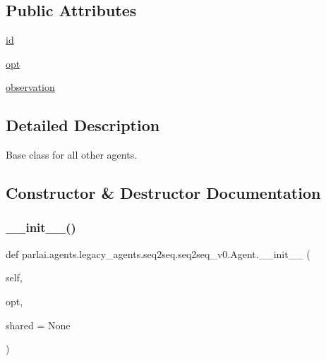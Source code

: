 \subsection*{Public Attributes}
\begin{DoxyCompactItemize}
\item 
\hyperlink{classparlai_1_1agents_1_1legacy__agents_1_1seq2seq_1_1seq2seq__v0_1_1Agent_a446e864fc95a310d508e3095c7f3d930}{id}
\item 
\hyperlink{classparlai_1_1agents_1_1legacy__agents_1_1seq2seq_1_1seq2seq__v0_1_1Agent_ae07383697f7232bb21cbd0a1c6e93389}{opt}
\item 
\hyperlink{classparlai_1_1agents_1_1legacy__agents_1_1seq2seq_1_1seq2seq__v0_1_1Agent_a6371fe160ef331078a794fc1d8b67371}{observation}
\end{DoxyCompactItemize}


\subsection{Detailed Description}
\begin{DoxyVerb}Base class for all other agents.
\end{DoxyVerb}
 

\subsection{Constructor \& Destructor Documentation}
\mbox{\label{classparlai_1_1agents_1_1legacy__agents_1_1seq2seq_1_1seq2seq__v0_1_1Agent_ae84057ceae2e7cf0b5d6248b48596b76}} 
\subsubsection{\texorpdfstring{\+\_\+\+\_\+init\+\_\+\+\_\+()}{\_\_init\_\_()}}
{\footnotesize\ttfamily def parlai.\+agents.\+legacy\+\_\+agents.\+seq2seq.\+seq2seq\+\_\+v0.\+Agent.\+\_\+\+\_\+init\+\_\+\+\_\+ (\begin{DoxyParamCaption}\item[{}]{self,  }\item[{}]{opt,  }\item[{}]{shared = {\ttfamily None} }\end{DoxyParamCaption})}



